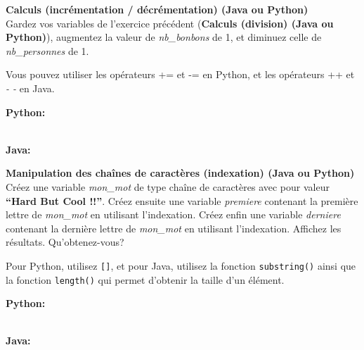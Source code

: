 \begin{Exercice}[5 minutes] \textbf{Calculs (incrémentation / décrémentation) (Java ou Python)} \optionnel\\
   Gardez vos variables de l'exercice précédent (\textbf{Calculs (division) (Java ou Python)}), augmentez la valeur de \textit{nb\_bonbons} de 1, et diminuez celle de \textit{nb\_personnes} de 1.  \\
   
    \begin{conseil}
      	Vous pouvez utiliser les opérateurs += et -= en Python, et les opérateurs ++ et \textit{- -} en Java.
        
    \end{conseil}
    \begin{solution}
    
    \textbf{Python:}
    
    
    \textbf{\\Java:}
    
           
    \end{solution}   
\end{Exercice}

\begin{Exercice}[5 minutes] \textbf{Manipulation des chaînes de caractères (indexation) (Java ou Python)}\\
   Créez une variable \textit{mon\_mot} de type chaîne de caractères avec pour valeur \textbf{``Hard But Cool !!''}. Créez ensuite une variable \textit{premiere} contenant la première lettre de \textit{mon\_mot} en utilisant l'indexation. Créez enfin une variable \textit{derniere} contenant la dernière lettre de \textit{mon\_mot} en utilisant l'indexation. Affichez les résultats. Qu'obtenez-vous? \\
   
    \begin{conseil}
      	Pour Python, utilisez \lstinline{[]}, et pour Java, utilisez la fonction \lstinline{substring()} ainsi que la fonction \lstinline{length()} qui permet d'obtenir la taille d'un élément.
        
    \end{conseil}
    \begin{solution}
    
    \textbf{Python:}
    
    
    \textbf{\\Java:}
    
           
    \end{solution}   
\end{Exercice}

